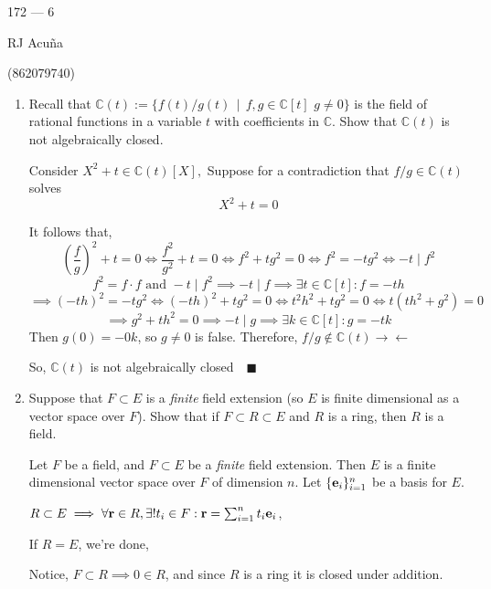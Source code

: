 \documentclass{article}
\newcommand\C{\mathbb{C}}
\begin{document}
\begin{center}
  172 --- 6

  RJ Acuña

  (862079740)
\end{center}\vspace{1.618em}


\begin{enumerate}

\item Recall that $\C(t) := \{f(t)/g(t) \,\mid\, f,g \in \C[t]\,\,g\not=0\}$ is the field of rational functions in a variable $t$ with coefficients in $\C$. Show that $\C(t)$ is not algebraically closed.


  Consider $X^2 + t \in \C(t)[X],$
  Suppose for a contradiction that $f/g \in \C(t)$ solves
  \begin{equation}X^2+t = 0\end{equation}

  It follows that, \[\left(\frac{f}{g}\right)^2 +t = 0 \iff
    \frac{f^2}{g^2} + t = 0 \iff  f^2 + tg^2 = 0 \iff f^2 = -tg^2
    \iff -t \mid f^2\]
  \[f^2 = f\cdot f \text{ and } -t \mid f^2 \implies -t\mid f
    \implies \exists t\in \C[t]: f = -t h\]
  \[\implies (-th)^2 = -tg^2 \iff (-th)^2 + tg^2 = 0 \iff t^2h^2 +tg^2
    = 0 \iff t(th^2 +g^2) = 0\]
  \[\implies g^2 + th^2 = 0 \implies -t\mid g \implies \exists k\in
    \C[t]: g = -tk\]
  Then $g(0) = -0k$,  so $g\neq 0$ is false. Therefore, $f/g \not\in
  \C(t)\rightarrow\leftarrow$

  So, $\C(t)$ is not algebraically closed$\quad \blacksquare$
 \item Suppose that $F \subset E$ is a \emph{finite} field extension
   (so $E$ is finite dimensional as a vector space over $F$). Show
   that if $F \subset R \subset E$ and $R$ is a ring, then $R$ is a
   field.



   Let $F$ be a field, and $F \subset E$ be a \emph{finite} field
   extension. Then $E$ is a finite dimensional vector space over
   $F$ of dimension $n$. Let $\{\vb{e}_i\}_{i=1}^{n}$ be a basis for $E$.

   $R\subset E \implies \forall \vb{r}\in R,\exists! t_i\in F:  \vb{r} =
   \sum_{i=1}^n t_i\vb{e}_i$,

   If $R = E$, we're done,

   Notice, $F\subset R\implies 0\in R$, and since $R$ is a ring it is
   closed under addition.


\end{enumerate}
\end{document}
